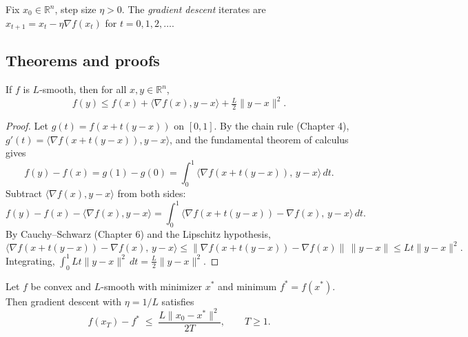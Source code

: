 \begin{definition}
Fix $x_0 \in \mathbb{R}^n$, step size $\eta > 0$. The \emph{gradient descent} iterates are $x_{t+1} = x_t - \eta \nabla f(x_t)$ for $t = 0, 1, 2, \ldots$.
\end{definition}

\subsection*{Theorems and proofs}

\begin{lemma}
If $f$ is $L$-smooth, then for all $x, y \in \mathbb{R}^n$,
\[
f(y) \leq f(x) + \langle \nabla f(x), y - x \rangle + \tfrac{L}{2}\|y - x\|^2.
\]
\end{lemma}

\begin{proof}
Let $g(t) = f(x + t(y - x))$ on $[0,1]$. By the chain rule (Chapter 4), $g'(t) = \langle \nabla f(x + t(y-x)), y - x\rangle$, and the fundamental theorem of calculus gives
\[
f(y) - f(x) = g(1) - g(0) = \int_0^1 \langle \nabla f(x + t(y-x)),\, y - x \rangle \, dt.
\]
Subtract $\langle \nabla f(x), y - x \rangle$ from both sides:
\[
f(y) - f(x) - \langle \nabla f(x), y - x \rangle = \int_0^1 \langle \nabla f(x + t(y-x)) - \nabla f(x),\, y - x \rangle \, dt.
\]
By Cauchy--Schwarz (Chapter 6) and the Lipschitz hypothesis,
\[
\langle \nabla f(x + t(y-x)) - \nabla f(x),\, y - x \rangle \leq \|\nabla f(x + t(y-x)) - \nabla f(x)\|\,\|y - x\| \leq L t \|y - x\|^2.
\]
Integrating, $\int_0^1 L t \|y - x\|^2 \, dt = \tfrac{L}{2}\|y - x\|^2$.
\end{proof}

\begin{theorem}
Let $f$ be convex and $L$-smooth with minimizer $x^*$ and minimum $f^* = f(x^*)$. Then gradient descent with $\eta = 1/L$ satisfies
\[
f(x_T) - f^* \;\leq\; \frac{L \|x_0 - x^*\|^2}{2T}, \qquad T \geq 1.
\]
\end{theorem}

